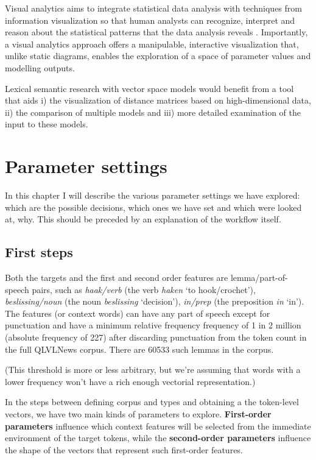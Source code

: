 \documentclass[
]{book}
\begin{document}
Visual analytics aims to integrate statistical data analysis with techniques from information visualization so that human analysts can recognize, interpret and reason about the statistical patterns that the data analysis reveals \autocite{card.etal_1999}. Importantly, a visual analytics approach offers a manipulable, interactive visualization that, unlike static diagrams, enables the exploration of a space of parameter values and modelling outputs.

Lexical semantic research with vector space models would benefit from a tool that aids
i) the visualization of distance matrices based on high-dimensional data,
ii) the comparison of multiple models and
iii) more detailed examination of the input to these models.

\hypertarget{parameter-settings}{%
\chapter{Parameter settings}\label{parameter-settings}}

In this chapter I will describe the various parameter settings we have explored:
which are the possible decisions, which ones we have set and which were looked at,
why. This should be preceded by an explanation of the workflow itself.

\hypertarget{first-steps}{%
\section{First steps}\label{first-steps}}

Both the targets and the first and second order features are lemma/part-of-speech pairs,
such as \emph{haak/verb} (the verb \emph{haken} `to hook/crochet'),
\emph{beslissing/noun} (the noun \emph{beslissing} `decision'), \emph{in/prep}
(the preposition \emph{in} `in').
The features (or context words) can have any part of speech except for punctuation
and have a minimum relative frequency frequency of 1 in 2 million (absolute frequency of 227)
after discarding punctuation from the token count in the full
QLVLNews corpus. There are 60533 such lemmas in the corpus.

(This threshold is more or less arbitrary, but we're assuming that words with a lower frequency
won't have a rich enough vectorial representation.)

In the steps between defining corpus and types and obtaining a the token-level vectors,
we have two main kinds of parameters to explore.
\textbf{First-order parameters} influence which context features will be selected
from the immediate environment of the target tokens,
while the \textbf{second-order parameters} influence the shape of the vectors
that represent such first-order features.
\end{document}
